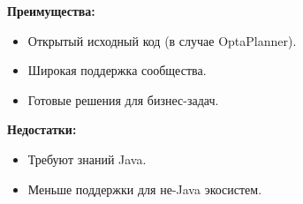 \noindent \textbf{Преимущества:}
\begin{itemize}
    \item Открытый исходный код (в случае OptaPlanner).
    \item Широкая поддержка сообщества.
    \item Готовые решения для бизнес-задач.
\end{itemize}

\vspace{3mm}
\aim
\vspace{3mm}

\noindent \textbf{Недостатки:}
\begin{itemize}
\item Требуют знаний Java.
\item Меньше поддержки для не-Java экосистем.
\end{itemize}

